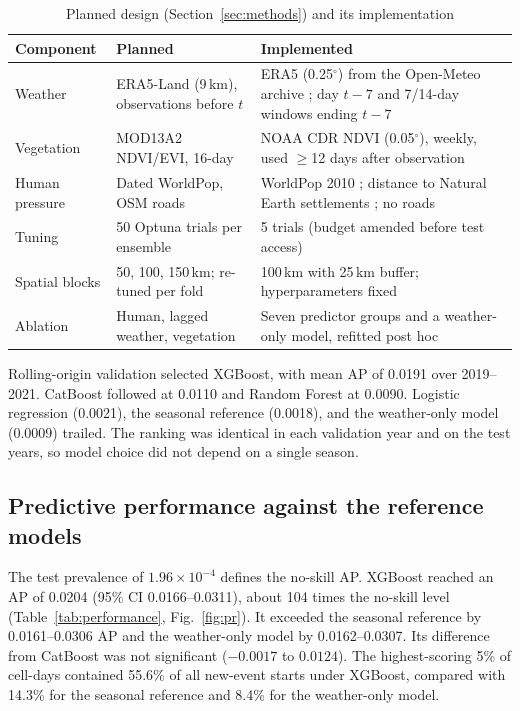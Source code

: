 \documentclass[pdflatex,sn-mathphys-num]{sn-jnl}
\begin{document}
\begin{table}[htbp]
\caption{Planned design (Section~\ref{sec:methods}) and its implementation}\label{tab:implementation}
\centering\footnotesize
\setlength{\tabcolsep}{3pt}
\begin{tabularx}{\textwidth}{@{}l X X@{}}
\toprule
Component & Planned & Implemented \\
\midrule
Weather & ERA5-Land (9\,km), observations before $t$ & ERA5 (0.25$^{\circ}$) from the Open-Meteo archive \cite{hersbach2020era5,openmeteoOpenData}; day $t-7$ and 7/14-day windows ending $t-7$ \\
Vegetation & MOD13A2 NDVI/EVI, 16-day & NOAA CDR NDVI (0.05$^{\circ}$), weekly, used $\geq$12 days after observation \cite{noaaCdrNdvi} \\
Human pressure & Dated WorldPop, OSM roads & WorldPop 2010 \cite{worldpop2010}; distance to Natural Earth settlements \cite{naturalEarthPlaces}; no roads \\
Tuning & 50 Optuna trials per ensemble & 5 trials (budget amended before test access) \\
Spatial blocks & 50, 100, 150\,km; re-tuned per fold & 100\,km with 25\,km buffer; hyperparameters fixed \\
Ablation & Human, lagged weather, vegetation & Seven predictor groups and a weather-only model, refitted post hoc \\
\bottomrule
\end{tabularx}
\end{table}

Rolling-origin validation selected XGBoost, with mean AP of 0.0191 over 2019--2021. CatBoost followed at 0.0110 and Random Forest at 0.0090. Logistic regression (0.0021), the seasonal reference (0.0018), and the weather-only model (0.0009) trailed. The ranking was identical in each validation year and on the test years, so model choice did not depend on a single season.

\subsection{Predictive performance against the reference models}\label{sec:res_performance}

The test prevalence of $1.96\times10^{-4}$ defines the no-skill AP. XGBoost reached an AP of 0.0204 (95\% CI 0.0166--0.0311), about 104 times the no-skill level (Table~\ref{tab:performance}, Fig.~\ref{fig:pr}). It exceeded the seasonal reference by 0.0161--0.0306 AP and the weather-only model by 0.0162--0.0307. Its difference from CatBoost was not significant ($-0.0017$ to $0.0124$). The highest-scoring 5\% of cell-days contained 55.6\% of all new-event starts under XGBoost, compared with 14.3\% for the seasonal reference and 8.4\% for the weather-only model.
\end{document}
